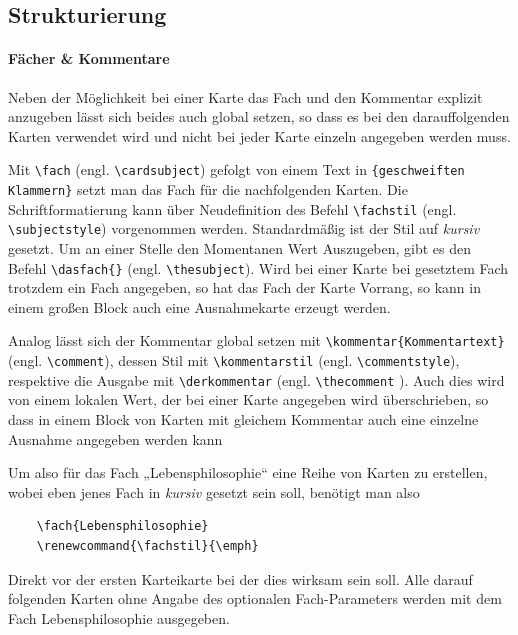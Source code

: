 \documentclass[a4paper,DIV=calc]{scrartcl}
\begin{document}
\subsection{Strukturierung}\label{subsec:Struktur}
\paragraph{Fächer \& Kommentare}
Neben der Möglichkeit bei einer Karte das Fach und den Kommentar explizit anzugeben lässt sich beides auch global setzen, so dass es bei den darauffolgenden Karten verwendet wird und nicht bei jeder Karte einzeln angegeben werden muss.

Mit \lstinline!\fach! (engl. \lstinline!\cardsubject!) gefolgt von einem Text in \lstinline!{geschweiften Klammern}! setzt man das Fach für die nachfolgenden Karten. Die Schriftformatierung kann über Neudefinition des Befehl \lstinline!\fachstil! (engl. \lstinline!\subjectstyle!) vorgenommen werden. Standardmäßig ist der Stil auf \emph{kursiv} gesetzt. Um an einer Stelle den Momentanen Wert Auszugeben, gibt es den Befehl \lstinline!\dasfach{}! (engl. \lstinline!\thesubject!). Wird bei einer Karte bei gesetztem Fach trotzdem ein Fach angegeben, so hat das Fach der Karte Vorrang, so kann in einem großen Block auch eine Ausnahmekarte erzeugt werden.

Analog lässt sich der Kommentar global setzen mit \lstinline!\kommentar{Kommentartext}! (engl. \lstinline!\comment!), dessen Stil mit \lstinline!\kommentarstil! (engl. \lstinline!\commentstyle!), respektive die Ausgabe mit \lstinline!\derkommentar! (engl. \lstinline!\thecomment! ). Auch dies wird von einem lokalen Wert, der bei einer Karte angegeben wird überschrieben, so dass in einem Block von Karten mit gleichem Kommentar auch eine einzelne Ausnahme angegeben werden kann

Um also für das Fach „Lebensphilosophie“ eine Reihe von Karten zu erstellen, wobei eben jenes Fach in \emph{kursiv} gesetzt sein soll, benötigt man also
\begin{lstlisting}
	\fach{Lebensphilosophie}
	\renewcommand{\fachstil}{\emph}
\end{lstlisting}
Direkt vor der ersten Karteikarte bei der dies wirksam sein soll. Alle darauf folgenden Karten ohne Angabe des optionalen Fach-Parameters werden mit dem Fach Lebensphilosophie ausgegeben.
\end{document}
